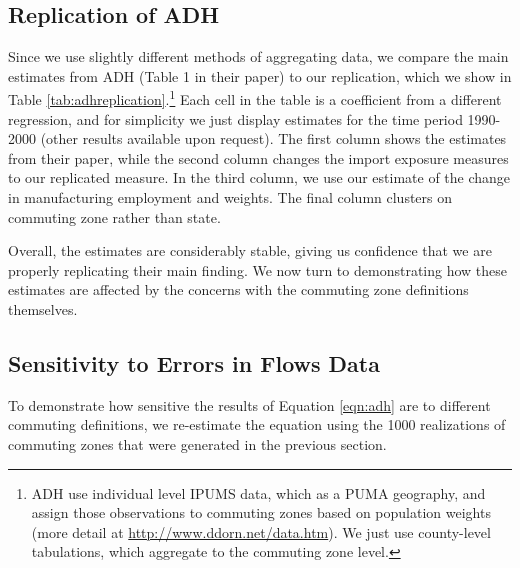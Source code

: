 \subsection{Replication of ADH}
\FloatBarrier
Since we use slightly different methods of aggregating data, we compare the main estimates from ADH (Table 1 in their paper) to our replication, which we show in Table \ref{tab:adhreplication}.\footnote{ADH use individual level IPUMS data, which as a PUMA geography, and assign those observations to commuting zones based on population weights (more detail at \url{http://www.ddorn.net/data.htm}). We just use county-level tabulations, which aggregate to the commuting zone level.} Each cell in the table is a coefficient from a different regression, and for simplicity we just display estimates for the time period 1990-2000 (other results available upon request). The first column shows the estimates from their paper, while the second column changes the import exposure measures to our replicated measure. In the third column, we use our estimate of the change in manufacturing employment and weights. The final column clusters on commuting zone rather than state.



Overall, the estimates are considerably stable, giving us confidence that we are properly replicating their main finding. We now turn to demonstrating how these estimates are affected by the concerns with the commuting zone definitions themselves.

\subsection{Sensitivity to Errors in Flows Data}

To demonstrate how sensitive the results of Equation \ref{eqn:adh} are to different commuting definitions, we re-estimate the equation using the 1000 realizations of commuting zones that were generated in the previous section.

